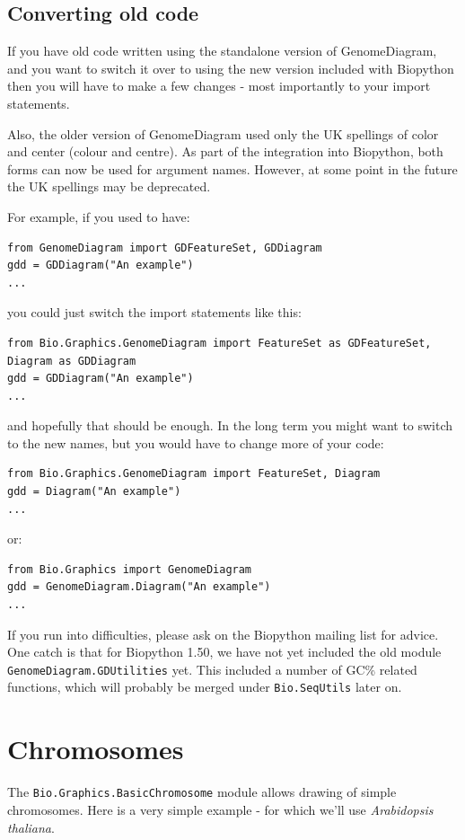 \documentclass{report}
\begin{document}
\subsection{Converting old code}

If you have old code written using the standalone version of GenomeDiagram, and
you want to switch it over to using the new version included with Biopython then
you will have to make a few changes - most importantly to your import statements.

Also, the older version of GenomeDiagram used only the UK spellings of color and
center (colour and centre).  As part of the integration into Biopython, both
forms can now be used for argument names. However, at some point in the future the
UK spellings may be deprecated.

For example, if you used to have:
\begin{verbatim}
from GenomeDiagram import GDFeatureSet, GDDiagram
gdd = GDDiagram("An example")
...
\end{verbatim}
you could just switch the import statements like this:
\begin{verbatim}
from Bio.Graphics.GenomeDiagram import FeatureSet as GDFeatureSet, Diagram as GDDiagram
gdd = GDDiagram("An example")
...
\end{verbatim}
and hopefully that should be enough.  In the long term you might want to
switch to the new names, but you would have to change more of your code:
\begin{verbatim}
from Bio.Graphics.GenomeDiagram import FeatureSet, Diagram
gdd = Diagram("An example")
...
\end{verbatim}
or:
\begin{verbatim}
from Bio.Graphics import GenomeDiagram
gdd = GenomeDiagram.Diagram("An example")
...
\end{verbatim}

If you run into difficulties, please ask on the Biopython mailing list for
advice. One catch is that for Biopython 1.50, we have not yet included the
old module \verb|GenomeDiagram.GDUtilities| yet.  This included a number of
GC\% related functions, which will probably be merged under
\verb|Bio.SeqUtils| later on.

\section{Chromosomes}

The \verb|Bio.Graphics.BasicChromosome| module allows drawing of simple chromosomes.
Here is a very simple example - for which we'll use \textit{Arabidopsis thaliana}.
\end{document}
